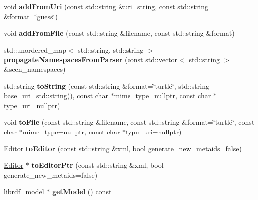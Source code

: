 \begin{DoxyCompactItemize}
void {\bfseries add\+From\+Uri} (const std\+::string \&uri\+\_\+string, const std\+::string \&format=\char`\"{}guess\char`\"{})
\item 
\mbox{\label{classomexmeta_1_1RDF_ac88eeb1a0f6911a2c1e4c43cef1b9047}} 
void {\bfseries add\+From\+File} (const std\+::string \&filename, const std\+::string \&format)
\item 
\mbox{\label{classomexmeta_1_1RDF_af5f598560ab2a4ebe661f9bdb8665755}} 
std\+::unordered\+\_\+map$<$ std\+::string, std\+::string $>$ {\bfseries propagate\+Namespaces\+From\+Parser} (const std\+::vector$<$ std\+::string $>$ \&seen\+\_\+namespaces)
\item 
\mbox{\label{classomexmeta_1_1RDF_a51b82471e4af4cc4a222b0fd6b6d6f1b}} 
std\+::string {\bfseries to\+String} (const std\+::string \&format=\char`\"{}turtle\char`\"{}, std\+::string base\+\_\+uri=std\+::string(), const char $\ast$mime\+\_\+type=nullptr, const char $\ast$type\+\_\+uri=nullptr)
\item 
\mbox{\label{classomexmeta_1_1RDF_a42a7be2a6261f03dc275b24a152dcaae}} 
void {\bfseries to\+File} (const std\+::string \&filename, const std\+::string \&format=\char`\"{}turtle\char`\"{}, const char $\ast$mime\+\_\+type=nullptr, const char $\ast$type\+\_\+uri=nullptr)
\item 
\mbox{\label{classomexmeta_1_1RDF_a433245557d941f8d7ec05272e1821b9f}} 
\hyperlink{classomexmeta_1_1Editor}{Editor} {\bfseries to\+Editor} (const std\+::string \&xml, bool generate\+\_\+new\+\_\+metaids=false)
\item 
\mbox{\label{classomexmeta_1_1RDF_ae65d6531b0c9fee1258ea2d1c7fd7c5f}} 
\hyperlink{classomexmeta_1_1Editor}{Editor} $\ast$ {\bfseries to\+Editor\+Ptr} (const std\+::string \&xml, bool generate\+\_\+new\+\_\+metaids=false)
\item 
\mbox{\label{classomexmeta_1_1RDF_a8007b0ce5729c7dd3f8cab86d42216f5}} 
librdf\+\_\+model $\ast$ {\bfseries get\+Model} () const
\item 
\mbox{\label{classomexmeta_1_1RDF_a71b0e5f3b85a87c2231e7700d86060c3}} 

\end{DoxyCompactItemize}
